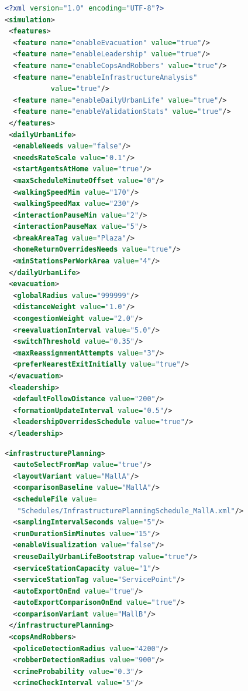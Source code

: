 \begin{figure}[H]
\noindent\begin{minipage}{\textwidth}
\begin{minipage}[t]{0.46\textwidth}
\begin{lstlisting}[language=XML,style=cfglst]
<?xml version="1.0" encoding="UTF-8"?>
<simulation>
 <features>
  <feature name="enableEvacuation" value="true"/>
  <feature name="enableLeadership" value="true"/>
  <feature name="enableCopsAndRobbers" value="true"/>
  <feature name="enableInfrastructureAnalysis"
           value="true"/>
  <feature name="enableDailyUrbanLife" value="true"/>
  <feature name="enableValidationStats" value="true"/>
 </features>
 <dailyUrbanLife>
  <enableNeeds value="false"/>
  <needsRateScale value="0.1"/>
  <startAgentsAtHome value="true"/>
  <maxScheduleMinuteOffset value="0"/>
  <walkingSpeedMin value="170"/>
  <walkingSpeedMax value="230"/>
  <interactionPauseMin value="2"/>
  <interactionPauseMax value="5"/>
  <breakAreaTag value="Plaza"/>
  <homeReturnOverridesNeeds value="true"/>
  <minStationsPerWorkArea value="4"/>
 </dailyUrbanLife>
 <evacuation>
  <globalRadius value="999999"/>
  <distanceWeight value="1.0"/>
  <congestionWeight value="2.0"/>
  <reevaluationInterval value="5.0"/>
  <switchThreshold value="0.35"/>
  <maxReassignmentAttempts value="3"/>
  <preferNearestExitInitially value="true"/>
 </evacuation>
 <leadership>
  <defaultFollowDistance value="200"/>
  <formationUpdateInterval value="0.5"/>
  <leadershipOverridesSchedule value="true"/>
 </leadership>
\end{lstlisting}
\end{minipage}%
\begin{minipage}[t]{0.54\textwidth}
\begin{lstlisting}[language=XML,style=cfglst]
 <infrastructurePlanning>
  <autoSelectFromMap value="true"/>
  <layoutVariant value="MallA"/>
  <comparisonBaseline value="MallA"/>
  <scheduleFile value=
   "Schedules/InfrastructurePlanningSchedule_MallA.xml"/>
  <samplingIntervalSeconds value="5"/>
  <runDurationSimMinutes value="15"/>
  <enableVisualization value="false"/>
  <reuseDailyUrbanLifeBootstrap value="true"/>
  <serviceStationCapacity value="1"/>
  <serviceStationTag value="ServicePoint"/>
  <autoExportOnEnd value="true"/>
  <autoExportComparisonOnEnd value="true"/>
  <comparisonVariant value="MallB"/>
 </infrastructurePlanning>
 <copsAndRobbers>
  <policeDetectionRadius value="4200"/>
  <robberDetectionRadius value="900"/>
  <crimeProbability value="0.3"/>
  <crimeCheckInterval value="5"/>

\end{lstlisting}
\end{minipage}
\end{minipage}
\end{figure}
